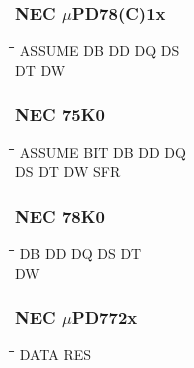 \subsubsection{NEC $\mu$PD78(C)1x}
{\tt\begin{tabbing}
\hspace{3cm}\=\hspace{3cm}\=\hspace{3cm}\=\hspace{3cm}\=\kill
ASSUME     \> DB          \> DD          \> DQ          \> DS \\
DT         \> DW \\
\end{tabbing}}

\subsubsection{NEC 75K0}
{\tt\begin{tabbing}
\hspace{3cm}\=\hspace{3cm}\=\hspace{3cm}\=\hspace{3cm}\=\kill
ASSUME     \> BIT         \> DB          \> DD          \> DQ \\
DS         \> DT          \> DW          \> SFR \\
\end{tabbing}}

\subsubsection{NEC 78K0}
{\tt\begin{tabbing}
\hspace{3cm}\=\hspace{3cm}\=\hspace{3cm}\=\hspace{3cm}\=\kill
DB         \> DD          \> DQ          \> DS          \> DT \\
DW \\
\end{tabbing}}

\subsubsection{NEC $\mu$PD772x}
{\tt\begin{tabbing}
\hspace{3cm}\=\hspace{3cm}\=\hspace{3cm}\=\hspace{3cm}\=\kill
DATA       \> RES \\
\end{tabbing}}

